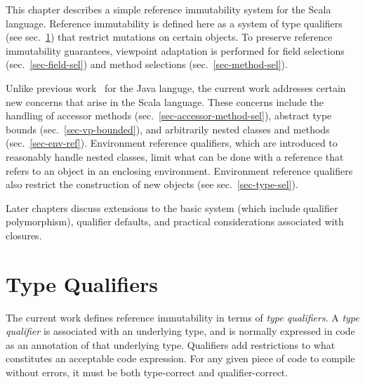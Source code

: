 
This chapter describes a simple reference immutability system for the Scala language.
Reference immutability is defined here as a system of type qualifiers (see sec.~\ref{sec-type-qualifiers}) that restrict mutations on certain objects.
To preserve reference immutability guarantees, viewpoint adaptation is performed
for field selections (sec.~\ref{sec-field-sel}) and method selections (sec.~\ref{sec-method-sel}).

Unlike previous work~\cite{javari,reim} for the Java languge, the current work
addresses certain new concerns that arise in the Scala language.
These concerns include the handling of accessor methods (sec.~\ref{sec-accessor-method-sel}),
abstract type bounds (sec.~\ref{sec-vp-bounded}),
and arbitrarily nested classes and methods (sec.~\ref{sec-env-ref}).
Environment reference qualifiers, which are introduced to
reasonably handle nested classes, limit what can be done
with a reference that refers to an object in an enclosing environment.
Environment reference qualifiers also restrict the construction of new
objects (see sec.~\ref{sec-type-sel}).

Later chapters discuss extensions to the basic system (which include qualifier polymorphism),
qualifier defaults, and
practical considerations associated with closures.


\section{Type Qualifiers} \label{sec-type-qualifiers}

The current work defines reference immutability in terms of {\em type qualifiers}.
A {\em type qualifier} is associated with an underlying type,
and is normally expressed in code as an annotation of that underlying type.
Qualifiers add restrictions to what constitutes an acceptable code expression.
For any given piece of code to compile without errors,
it must be both type-correct and qualifier-correct.

